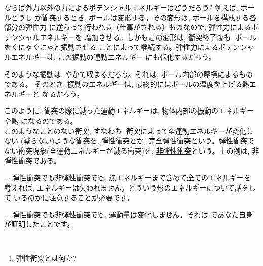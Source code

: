 ならば外力以外の力によるポテンシャルエネルギーはどうだろう? 例えば, ボールどうし
が衝突するとき, ボールは変形する。その変形は, ボールを構成する各部分の弾性力
に逆らって行われる（仕事がされる）ものなので, 弾性力によるポテンシャルエネルギーを
増加させる。しかもこの変形は, 衝突終了後も, ボールをぐにゃぐにゃと振動させる
ことによって継続する。弾性力によるポテンシャルエネルギーは, この振動の運動エネルギー
にも転化するだろう。

そのような振動は, やがて収まるだろう。それは, ボール内部の摩擦によるものである。
そのとき, 振動のエネルギーは, 最終的にはボールの温度を上げる熱エネルギーと
なるだろう。

このように, 衝突の際に減った運動エネルギーは, 物体内部の振動のエネルギーや熱
になるのである。\\

このようなことのない衝突, すなわち, 衝突によって全運動エネルギーが変化しない
(減らない)ような衝突を, \underline{弾性衝突}とか, 
完全弾性衝突という。弾性衝突でない衝突現象(全運動エネルギーが減る衝突)を, 
\underline{非弾性衝突}という。上の例は, 非弾性衝突である。
\mv

\begin{freqmiss}{\small{}
... 弾性衝突でも非弾性衝突でも, 熱エネルギーまで含めて全てのエネルギーを
考えれば, エネルギーは失われません。どういう形のエネルギーについて話をして
いるのかに注意することが必要です。}\end{freqmiss}

\begin{freqmiss}{\small{}
... 弾性衝突でも非弾性衝突でも, 運動量は変化しません。それは
であなた自身が証明したことです。}\end{freqmiss}

\begin{q}\label{q:elastic_collision}　
\begin{enumerate}
\item 弾性衝突とは何か?
\end{enumerate}
\end{q}
\mv

